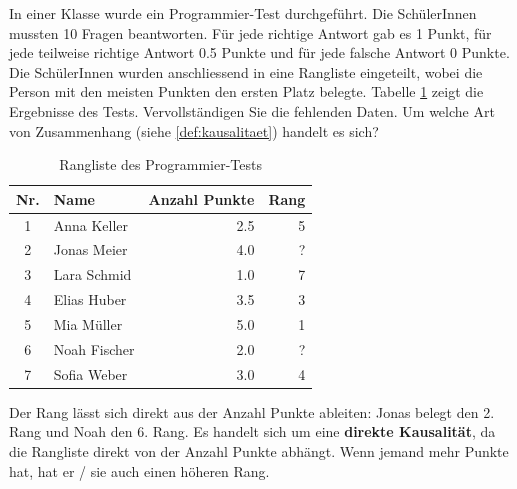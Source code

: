\begin{myexercise}
	In einer Klasse wurde ein Programmier-Test durchgeführt. Die SchülerInnen mussten 10 Fragen beantworten. Für jede richtige Antwort gab es 1 Punkt, für jede teilweise richtige Antwort 0.5 Punkte und für jede falsche Antwort 0 Punkte. Die SchülerInnen wurden anschliessend in eine Rangliste eingeteilt, wobei die Person mit den meisten Punkten den ersten Platz belegte. Tabelle \ref{tab:rangliste} zeigt die Ergebnisse des Tests. Vervollständigen Sie die fehlenden Daten. Um welche Art von Zusammenhang (siehe \cref{def:kausalitaet}) handelt es sich?
	\begin{table}[H]
		\centering
		\begin{tabular}{clrr}
			\midrule
			Nr. & Name         & Anzahl Punkte & Rang \\
			\midrule
			1   & Anna Keller  & 2.5           & 5    \\
			2   & Jonas Meier  & 4.0           & ?    \\
			3   & Lara Schmid  & 1.0           & 7    \\
			4   & Elias Huber  & 3.5           & 3    \\
			5   & Mia Müller   & 5.0           & 1    \\
			6   & Noah Fischer & 2.0           & ?    \\
			7   & Sofia Weber  & 3.0           & 4    \\
			\midrule
		\end{tabular}
		\caption{Rangliste des Programmier-Tests}
		\label{tab:rangliste}
	\end{table}
	\begin{myanswer}
		Der Rang lässt sich direkt aus der Anzahl Punkte ableiten: Jonas belegt den 2. Rang und Noah den 6. Rang. Es handelt sich um eine \textbf{direkte Kausalität}, da die Rangliste direkt von der Anzahl Punkte abhängt. Wenn jemand mehr Punkte hat, hat er / sie auch einen höheren Rang.
	\end{myanswer}
\end{myexercise}

